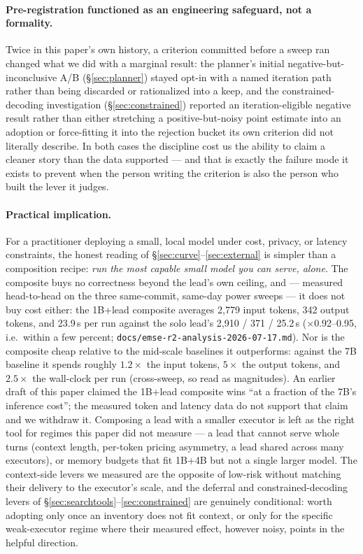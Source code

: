 \documentclass[smallcondensed,natbib]{svjour3}
\begin{document}
\paragraph{Pre-registration functioned as an engineering safeguard, not
a formality.} Twice in this paper's own history, a criterion committed
before a sweep ran changed what we did with a marginal result: the
planner's initial negative-but-inconclusive A/B (\S\ref{sec:planner})
stayed opt-in with a named iteration path rather than being discarded or
rationalized into a keep, and the constrained-decoding investigation
(\S\ref{sec:constrained}) reported an iteration-eligible negative result
rather than either stretching a positive-but-noisy point estimate into
an adoption or force-fitting it into the rejection bucket its own
criterion did not literally describe. In both cases the discipline cost
us the ability to claim a cleaner story than the data supported --- and
that is exactly the failure mode it exists to prevent when the person
writing the criterion is also the person who built the lever it judges.

\paragraph{Practical implication.} For a practitioner deploying a
small, local model under cost, privacy, or latency constraints, the
honest reading of \S\ref{sec:curve}--\ref{sec:external} is simpler
than a composition recipe: \emph{run the most capable small model you
can serve, alone}. The composite buys no correctness beyond the lead's
own ceiling, and --- measured head-to-head on the three same-commit,
same-day power sweeps --- it does not buy cost either: the 1B+lead
composite averages 2{,}779 input tokens, 342 output tokens, and 23.9\,s
per run against the solo lead's 2{,}910 / 371 / 25.2\,s
($\times$0.92--0.95, i.e.\ within a few percent;
\texttt{docs/emse-r2-analysis-2026-07-17.md}). Nor is the composite
cheap relative to the mid-scale baselines it outperforms: against the
7B baseline it spends roughly $1.2\times$ the input tokens, $5\times$
the output tokens, and $2.5\times$ the wall-clock per run
(cross-sweep, so read as magnitudes). An earlier draft of this paper
claimed the 1B+lead composite wins ``at a fraction of the 7B's
inference cost''; the measured token and latency data do not support
that claim and we withdraw it. Composing a lead with a smaller
executor is left as the right tool for regimes this paper did not
measure --- a lead that cannot serve whole turns (context length,
per-token pricing asymmetry, a lead shared across many executors), or
memory budgets that fit 1B+4B but not a single larger model. The
context-side levers we measured are the opposite of low-risk without
matching their delivery to the executor's scale, and the deferral and
constrained-decoding levers of
\S\ref{sec:searchtools}--\ref{sec:constrained} are genuinely conditional:
worth adopting only once an inventory does not fit context, or only for
the specific weak-executor regime where their measured effect, however
noisy, points in the helpful direction.
\end{document}
